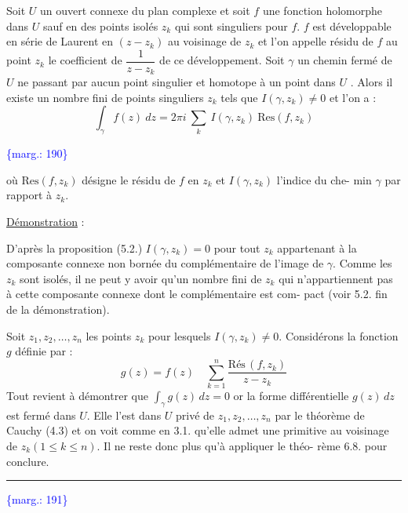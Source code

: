 \documentclass[11pt]{article}
\newcommand{\scanpage}[1]{\par\bigskip\noindent{\small\sffamily[scan #1]}\par}
\newcommand{\mspage}[1]{{\small\sffamily[p.\,#1]}}
\newcommand{\margin}[1]{\textcolor{blue}{\{\textsf{marg.:} #1\}}}
\newcommand{\uline}[1]{\underline{#1}}
\begin{document}
Soit $U$ un ouvert connexe du plan complexe et soit $f$ une fonction
holomorphe dans $U$ sauf en des points isolés $z_k$ qui sont singuliers pour $f$.
$f$ est développable en série de Laurent en $(z-z_k)$ au voisinage de $z_k$ et l'on
appelle résidu de $f$ au point $z_k$ le coefficient de $\dfrac{1}{z - z_k}$ de ce développement.
Soit $\gamma$ un chemin fermé de $U$ ne passant par aucun point singulier et homotope
à un point dans $U$ . Alors il existe un nombre fini de points singuliers $z_k$
tels que $I(\gamma,z_k) \neq 0$ et l'on a :
\[ \int_\gamma f(z)\ dz = 2\pi i \ \sum_k \ I(\gamma,z_k)\ \mathrm{Res}(f,z_k) \]

\margin{190}

\clearpage
\scanpage{119/191}
\mspage{- 10 -}

où $\mathrm{Res}(f,z_k)$ désigne le résidu de $f$ en $z_k$ et $I(\gamma,z_k)$ l'indice du che-%
min $\gamma$ par rapport à $z_k$.

\uline{Démonstration} :

D'après la proposition (5.2.) $I(\gamma,z_k) = 0$ pour tout $z_k$ appartenant
à la composante connexe non bornée du complémentaire de l'image de $\gamma$.
Comme les $z_k$ sont isolés, il ne peut y avoir qu'un nombre fini de $z_k$ qui
n'appartiennent pas à cette composante connexe dont le complémentaire est com-%
pact (voir 5.2. fin de la démonstration).

Soit $z_1,z_2,\dots,z_n$ les points $z_k$ pour lesquels $I(\gamma,z_k) \neq 0$.
Considérons la fonction $g$ définie par :
\[ g(z) = f(z) \quad \sum_{k=1}^{n} \frac{\mathrm{Rés}\,(f,z_k)}{z-z_k} \]
Tout revient à démontrer que $\displaystyle\int_\gamma g(z)\,dz = 0$ or la forme différentielle
$g(z)\,dz$ est fermé dans $U$. Elle l'est dans $U$ privé de $z_1,z_2,\dots,z_n$ par le
théorème de Cauchy (4.3) et on voit comme en 3.1. qu'elle admet une primitive
au voisinage de $z_k(1 \leq k \leq n)$. Il ne reste donc plus qu'à appliquer le théo-%
rème 6.8. pour conclure.

\begin{center}\rule{4cm}{0.4pt}\end{center}

\margin{191}
\end{document}
